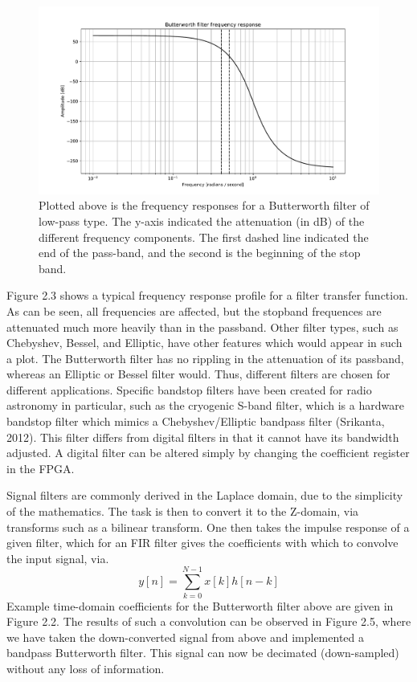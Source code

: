 \documentclass{report}
\begin{document}
\begin{figure}[ht]
\includegraphics[scale=.45]{Figure_2.pdf}
\caption{Plotted above is the frequency responses for a Butterworth filter of low-pass type.  The y-axis indicated the attenuation (in dB) of the different frequency components.  The first dashed line indicated the end of the pass-band, and the second is the beginning of the stop band.}
\end{figure} 

Figure 2.3 shows a typical frequency response profile for a filter transfer function.  As can be seen, all frequencies are affected, but the stopband frequences are attenuated much more heavily than in the passband.  Other filter types, such as Chebyshev, Bessel, and Elliptic, have other features which would appear in such a plot.  The Butterworth filter has no rippling in the attenuation of its passband, whereas an Elliptic or Bessel filter would.  Thus, different filters are chosen for different applications.  Specific bandstop filters have been created for radio astronomy in particular, such as the cryogenic S-band filter, which is a hardware bandstop filter which mimics a Chebyshev/Elliptic bandpass filter (Srikanta, 2012).  This filter differs from digital filters in that it cannot have its bandwidth adjusted.  A digital filter can be altered simply by changing the coefficient register in the FPGA.

Signal filters are commonly derived in the Laplace domain, due to the simplicity of the mathematics.  The task is then to convert it to the Z-domain, via transforms such as a bilinear transform.  One then takes the impulse response of a given filter, which for an FIR filter gives the coefficients with which to convolve the input signal, via.
\begin{equation}
y[n] = \sum^{N-1}_{k=0}x[k]h[n-k]
\end{equation}
Example time-domain coefficients for the Butterworth filter above are given in Figure 2.2. The results of such a convolution can be observed in Figure 2.5, where we have taken the down-converted signal from above and implemented a bandpass Butterworth filter.  This signal can now be decimated (down-sampled) without any loss of information.
 
\end{document}
